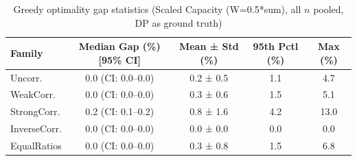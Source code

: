 \begin{table}[tb]
\centering
\caption{Greedy optimality gap statistics (Scaled Capacity (W=0.5*sum), all $n$ pooled, DP as ground truth)}
\label{tab:scaled-greedy-gap}
\begin{tabular}{lcccc}
\toprule
Family & Median Gap (\%) [95\% CI] & Mean ± Std (\%) & 95th Pctl (\%) & Max (\%) \\
\midrule
Uncorr. & 0.0 (CI: 0.0–0.0) & 0.2 ± 0.5 & 1.1 & 4.7 \\
WeakCorr. & 0.0 (CI: 0.0–0.0) & 0.3 ± 0.6 & 1.5 & 5.1 \\
StrongCorr. & 0.2 (CI: 0.1–0.2) & 0.8 ± 1.6 & 4.2 & 13.0 \\
InverseCorr. & 0.0 (CI: 0.0–0.0) & 0.0 ± 0.0 & 0.0 & 0.0 \\
EqualRatios & 0.0 (CI: 0.0–0.0) & 0.3 ± 0.8 & 1.5 & 6.8 \\
\bottomrule
\end{tabular}
\end{table}
